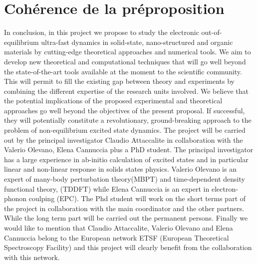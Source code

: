 \section{Cohérence de la préproposition}
In conclusion, in this project we propose to study the electronic out-of-equilibrium ultra-fast dynamics in solid-state, nano-structured and organic materials by cutting-edge theoretical approaches and numerical tools. We aim to develop new theoretical and computational techniques that will go well beyond the state-of-the-art tools available at the moment to the scientific community. This will permit to fill the existing gap between theory and experiments by combining the different  expertise of the research units involved. We believe that the potential implications of the proposed experimental and theoretical approaches go well beyond the objectives of the present proposal. If successful, they will potentially constitute a revolutionary, ground-breaking approach to the problem of non-equilibrium excited state dynamics. 
The project will be carried out by the principal investigator Claudio Attaccalite in collaboration with the Valerio Olevano, Elena Cannuccia plus a PhD student. The principal investigator has a large experience in ab-initio calculation of excited states and in particular linear and non-linear response in solids states physics. Valerio Olevano is an expert of many-body perturbation theory(MBPT) and time-dependent density functional theory, (TDDFT) while Elena Cannuccia is an expert in electron-phonon coulping (EPC).   
The  Phd student will  work on the short terms part of the project in collaboration with the main coordinator and the other partners. While the long term part will be carried out the permanent persons.  Finally we would like to mention that  Claudio Attaccalite, Valerio Olevano and Elena Cannuccia belong to the European network ETSF (European Theoretical Spectroscopy Facility) and this project will clearly benefit from the collaboration with this network.
